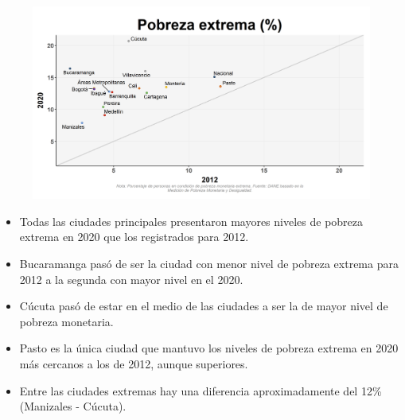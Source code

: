     \begin{figure}[H]
        \caption[Pobreza extrema por ciudades - 2012 VS 2020 ]{\label{pobreza_extrema_ciudades_vs} }
        \begin{center}
        \includegraphics[width=\textwidth,keepaspectratio]{img/var_257_scatter_time.png}
        \end{center}
    \end{figure}
            \begin{itemize}
                    \item Todas las ciudades principales presentaron mayores niveles de pobreza extrema en 2020 que los registrados para 2012.
                    \item Bucaramanga pasó de ser la ciudad con menor nivel de pobreza extrema para 2012 a la segunda con mayor nivel en el 2020.
                    \item Cúcuta pasó de estar en el medio de las ciudades a ser la de mayor nivel de pobreza monetaria.
                    \item Pasto es la única ciudad que mantuvo los niveles de pobreza extrema en 2020 más cercanos a los de 2012, aunque superiores.
                    \item Entre las ciudades extremas hay una diferencia aproximadamente del 12\% (Manizales - Cúcuta).
                    \end{itemize}


